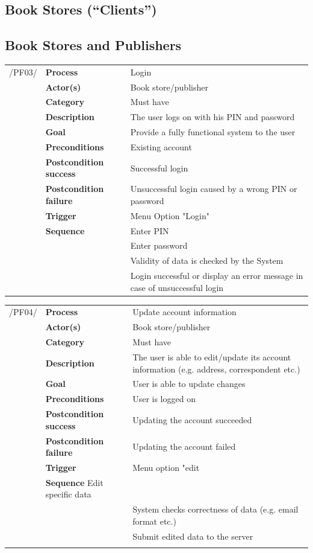 \documentclass[11pt,a4paper,oneside,svgnames]{report}
\begin{document}
\subsection{Book Stores (``Clients'')}

\subsection{Book Stores and Publishers}

\noindent
\begin{tabular}{p{1.5cm}p{3cm}p{8cm}}
/PF03/	& \textbf{Process} & Login\\
		& \textbf{Actor(s)} & Book store/publisher\\
		& \textbf{Category} & Must have\\
		& \textbf{Description}	 & The user logs on with his PIN and password\\
		& \textbf{Goal} & Provide a fully functional system to the user\\
		& \textbf{Preconditions} & Existing account\\
		& \textbf{Postcondition success} & Successful login\\
		& \textbf{Postcondition failure} & Unsuccessful login caused by a wrong PIN or password\\
		& \textbf{Trigger} & Menu Option "Login"\\
		& \textbf{Sequence} & Enter PIN\\
		& & Enter password\\
		& & Validity of data is checked by the System\\
		& & Login successful or display an error message in case of unsuccessful login
		
\hfill \\
\end{tabular}

\noindent
\begin{tabular}{p{1.5cm}p{3cm}p{8cm}}
/PF04/	& \textbf{Process} & Update account information\\
		& \textbf{Actor(s)} & Book store/publisher\\
		& \textbf{Category} & Must have\\
		& \textbf{Description}	 & The user is able to edit/update its account information (e.g. address, correspondent etc.)\\
		& \textbf{Goal} & User is able to update changes\\
		& \textbf{Preconditions} & User is logged on\\
		& \textbf{Postcondition success} & Updating the account succeeded\\
		& \textbf{Postcondition failure} & Updating the account failed\\
		& \textbf{Trigger} & Menu option "edit\\
		& \textbf{Sequence} Edit specific data\\
		& & System checks correctness of data (e.g. email format etc.)\\
		& & Submit edited data to the server\\
		
\hfill \\
\end{tabular}
\end{document}
